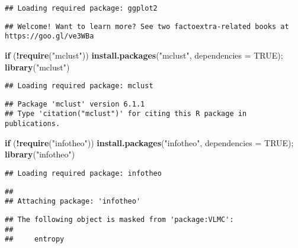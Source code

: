 \documentclass[
]{article}
\newenvironment{Shaded}{\begin{snugshade}}{\end{snugshade}}
\newcommand{\AttributeTok}[1]{\textcolor[rgb]{0.13,0.29,0.53}{#1}}
\newcommand{\ConstantTok}[1]{\textcolor[rgb]{0.56,0.35,0.01}{#1}}
\newcommand{\ControlFlowTok}[1]{\textcolor[rgb]{0.13,0.29,0.53}{\textbf{#1}}}
\newcommand{\FunctionTok}[1]{\textcolor[rgb]{0.13,0.29,0.53}{\textbf{#1}}}
\newcommand{\NormalTok}[1]{#1}
\newcommand{\SpecialCharTok}[1]{\textcolor[rgb]{0.81,0.36,0.00}{\textbf{#1}}}
\newcommand{\StringTok}[1]{\textcolor[rgb]{0.31,0.60,0.02}{#1}}
\begin{document}
\begin{verbatim}
## Loading required package: ggplot2
\end{verbatim}

\begin{verbatim}
## Welcome! Want to learn more? See two factoextra-related books at https://goo.gl/ve3WBa
\end{verbatim}

\begin{Shaded}
\begin{Highlighting}[]
\ControlFlowTok{if}\NormalTok{ (}\SpecialCharTok{!}\FunctionTok{require}\NormalTok{(}\StringTok{"mclust"}\NormalTok{)) }\FunctionTok{install.packages}\NormalTok{(}\StringTok{"mclust"}\NormalTok{, }\AttributeTok{dependencies =} \ConstantTok{TRUE}\NormalTok{); }\FunctionTok{library}\NormalTok{(}\StringTok{"mclust"}\NormalTok{)}
\end{Highlighting}
\end{Shaded}

\begin{verbatim}
## Loading required package: mclust
\end{verbatim}

\begin{verbatim}
## Package 'mclust' version 6.1.1
## Type 'citation("mclust")' for citing this R package in publications.
\end{verbatim}

\begin{Shaded}
\begin{Highlighting}[]
\ControlFlowTok{if}\NormalTok{ (}\SpecialCharTok{!}\FunctionTok{require}\NormalTok{(}\StringTok{"infotheo"}\NormalTok{)) }\FunctionTok{install.packages}\NormalTok{(}\StringTok{"infotheo"}\NormalTok{, }\AttributeTok{dependencies =} \ConstantTok{TRUE}\NormalTok{); }\FunctionTok{library}\NormalTok{(}\StringTok{"infotheo"}\NormalTok{)}
\end{Highlighting}
\end{Shaded}

\begin{verbatim}
## Loading required package: infotheo
\end{verbatim}

\begin{verbatim}
## 
## Attaching package: 'infotheo'
\end{verbatim}

\begin{verbatim}
## The following object is masked from 'package:VLMC':
## 
##     entropy
\end{verbatim}
\end{document}
